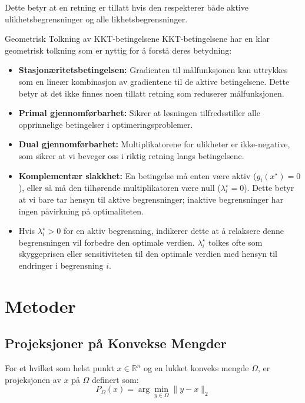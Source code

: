 Dette betyr at en retning er tillatt hvis den respekterer både aktive ulikhetsbegrensninger og alle likhetsbegrensninger.

\begin{remark}{Geometrisk Tolkning av KKT-betingelsene}{}
	KKT-betingelsene har en klar geometrisk tolkning som er nyttig for å forstå deres betydning:

	\begin{itemize}
		\item \textbf{Stasjonæritetsbetingelsen:} Gradienten til målfunksjonen kan uttrykkes som en lineær kombinasjon av gradientene til de aktive betingelsene. Dette betyr at det ikke finnes noen tillatt retning som reduserer målfunksjonen.

		\item \textbf{Primal gjennomførbarhet:} Sikrer at løsningen tilfredsstiller alle opprinnelige betingelser i optimeringsproblemer.

		\item \textbf{Dual gjennomførbarhet:} Multiplikatorene for ulikheter er ikke-negative, som sikrer at vi beveger oss i riktig retning langs betingelsene.

		\item \textbf{Komplementær slakkhet:} En betingelse må enten være aktiv ($g_i(x^\star) = 0$), eller så må den tilhørende multiplikatoren være null ($\lambda_i^\star = 0$). Dette betyr at vi bare tar hensyn til aktive begrensninger; inaktive begrensninger har ingen påvirkning på optimaliteten.

		\item Hvis $\lambda_i^\star > 0$ for en aktiv begrensning, indikerer dette at å relaksere denne begrensningen vil forbedre den optimale verdien. $\lambda_i^\star$ tolkes ofte som skyggeprisen eller sensitiviteten til den optimale verdien med hensyn til endringer i begrensning $i$.
	\end{itemize}
\end{remark}

\chapter{Metoder}
\label{sec:convex_optimization_methods}

\section{Projeksjoner på Konvekse Mengder}
For et hvilket som helst punkt \( x \in \mathbb{R}^n \) og en lukket konveks mengde \( \Omega \), er projeksjonen av \( x \) på \( \Omega \) definert som:
\[
	P_\Omega(x) = \arg\min_{y \in \Omega} \|y - x\|_2
\]

